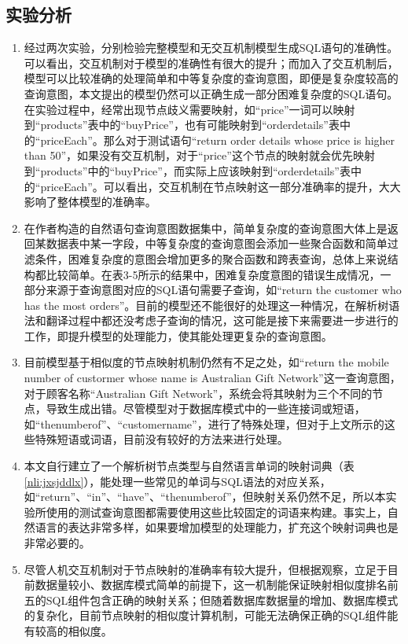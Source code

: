 \subsection{实验分析}
\begin{enumerate}
    \item   经过两次实验，分别检验完整模型和无交互机制模型生成SQL语句的准确性。可以看出，交互机制对于模型的准确性有很大的提升；而加入了交互机制后，模型可以比较准确的处理简单和中等复杂度的查询意图，即便是复杂度较高的查询意图，本文提出的模型仍然可以正确生成一部分困难复杂度的SQL语句。在实验过程中，经常出现节点歧义需要映射，如“price”一词可以映射到“products”表中的“buyPrice”，也有可能映射到“orderdetails”表中的“priceEach”。那么对于测试语句“return order details whose price is higher than 50”，如果没有交互机制，对于“price”这个节点的映射就会优先映射到“products”中的“buyPrice”，而实际上应该映射到“orderdetails”表中的“priceEach”。可以看出，交互机制在节点映射这一部分准确率的提升，大大影响了整体模型的准确率。
    \item	在作者构造的自然语句查询意图数据集中，简单复杂度的查询意图大体上是返回某数据表中某一字段，中等复杂度的查询意图会添加一些聚合函数和简单过滤条件，困难复杂度的意图会增加更多的聚合函数和跨表查询，总体上来说结构都比较简单。在表3-5所示的结果中，困难复杂度意图的错误生成情况，一部分来源于查询意图对应的SQL语句需要子查询，如“return the customer who has the most orders”。目前的模型还不能很好的处理这一种情况，在解析树语法和翻译过程中都还没考虑子查询的情况，这可能是接下来需要进一步进行的工作，即提升模型的处理能力，使其能处理更复杂的查询意图。
    \item	目前模型基于相似度的节点映射机制仍然有不足之处，如“return the mobile number of custormer whose name is Australian Gift Network”这一查询意图，对于顾客名称“Australian Gift Network”，系统会将其映射为三个不同的节点，导致生成出错。尽管模型对于数据库模式中的一些连接词或短语，如“thenumberof”、“customername”，进行了特殊处理，但对于上文所示的这些特殊短语或词语，目前没有较好的方法来进行处理。
    \item	本文自行建立了一个解析树节点类型与自然语言单词的映射词典（表\ref{nli:jxsjddlx}），能处理一些常见的单词与SQL语法的对应关系，如“return”、“in”、“have”、“thenumberof”，但映射关系仍然不足，所以本实验所使用的测试查询意图都需要使用这些比较固定的词语来构建。事实上，自然语言的表达非常多样，如果要增加模型的处理能力，扩充这个映射词典也是非常必要的。
    \item	尽管人机交互机制对于节点映射的准确率有较大提升，但根据观察，立足于目前数据量较小、数据库模式简单的前提下，这一机制能保证映射相似度排名前五的SQL组件包含正确的映射关系；但随着数据库数据量的增加、数据库模式的复杂化，目前节点映射的相似度计算机制，可能无法确保正确的SQL组件能有较高的相似度。
\end{enumerate}



